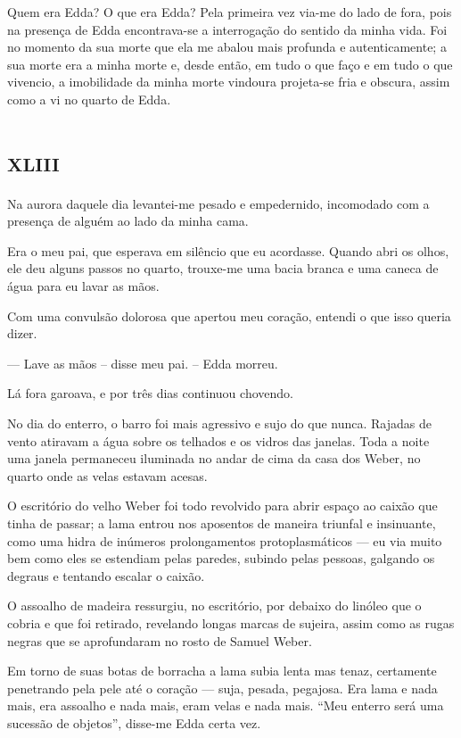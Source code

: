 Quem era Edda? O que era Edda? Pela primeira vez via-me do lado de fora, pois na presença de Edda encontrava-se a interrogação do sentido da minha vida. Foi no momento da sua morte que ela me abalou mais profunda e autenticamente; a sua morte era a minha morte e, desde então, em tudo o que faço e em tudo o que vivencio, a imobilidade da minha morte vindoura projeta-se fria e obscura, assim como a vi no quarto de Edda.


\chapter*{\huge\centering\textsc{xliii}}

Na aurora daquele dia levantei-me pesado e empedernido, incomodado com a presença de alguém ao lado da minha cama.

Era o meu pai, que esperava em silêncio que eu acordasse. Quando abri os olhos, ele deu alguns passos no quarto, trouxe-me uma bacia branca e uma caneca de água para eu lavar as mãos.

Com uma convulsão dolorosa que apertou meu coração, entendi o que isso queria dizer.

--- Lave as mãos -- disse meu pai. -- Edda morreu.

Lá fora garoava, e por três dias continuou chovendo.

No dia do enterro, o barro foi mais agressivo e sujo do que nunca. Rajadas de vento atiravam a água sobre os telhados e os vidros das janelas. Toda a noite uma janela permaneceu iluminada no andar de cima da casa dos Weber, no quarto onde as velas estavam acesas.

O escritório do velho Weber foi todo revolvido para abrir espaço ao caixão que tinha de passar; a lama entrou nos aposentos de maneira triunfal e insinuante, como uma hidra de inúmeros prolongamentos protoplasmáticos --- eu via muito bem como eles se estendiam pelas paredes, subindo pelas pessoas, galgando os degraus e tentando escalar o caixão.

O assoalho de madeira ressurgiu, no escritório, por debaixo do linóleo que o cobria e que foi retirado, revelando longas marcas de sujeira, assim como as rugas negras que se aprofundaram no rosto de Samuel Weber.

Em torno de suas botas de borracha a lama subia lenta mas tenaz, certamente penetrando pela pele até o coração --- suja, pesada, pegajosa. Era lama e nada mais, era assoalho e nada mais, eram velas e nada mais. ``Meu enterro será uma sucessão de objetos'', disse-me Edda certa vez.

